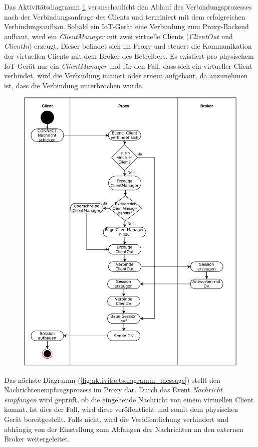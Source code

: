     Das Aktivitätsdiagramm \ref{fig:aktivitaetsdiagramm_connect} veranschaulicht den Ablauf des Verbindungsprozesses nach der Verbindungsanfrage des Clients und terminiert mit dem erfolgreichen Verbindungsaufbau.
    Sobald ein \ac{IoT}-Gerät eine Verbindung zum Proxy-Backend aufbaut, wird ein \emph{ClientManager} mit zwei virtuelle Clients (\emph{ClientOut} und \emph{ClientIn}) erzeugt. Dieser befindet sich im Proxy und steuert die Kommunikation der virtuellen Clients mit dem Broker des Betreibers. Es existiert pro physischem \ac{IoT}-Gerät nur ein \emph{ClientManager} und für den Fall, dass sich ein virtueller Client verbindet, wird die Verbindung initiiert oder erneut aufgebaut, da anzunehmen ist, dass die Verbindung unterbrochen wurde.
    
    \begin{figure}[!h]%
        \centering
        \includegraphics[width=14cm]{tex/bilder/4_konzept/Activity_Connect.pdf}
        \label{fig:aktivitaetsdiagramm_connect}
    \end{figure}
    \newpage
    Das nächste Diagramm (\ref{fig:aktivitaetsdiagramm_message}) stellt den Nachrichtenempfangsprozess im Proxy dar.
    Durch das Event \emph{Nachricht empfangen} wird geprüft, ob die eingehende Nachricht von einem virtuellen Client kommt. Ist dies der Fall, wird diese veröffentlicht und somit dem physischen Gerät bereitgestellt. Falls nicht, wird die Veröffentlichung verhindert und abhängig von der Einstellung zum Abfangen der Nachrichten an den externen Broker weitergeleitet.
    
